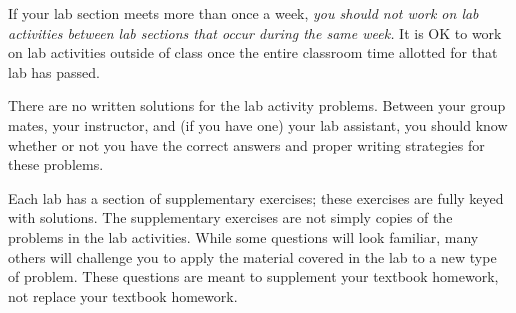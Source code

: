 \documentclass[12pt,]{book}
\theoremstyle{plain}
\theoremstyle{definition}
\numberwithin{equation}{section}
\begin{document}
\par
If your lab section meets more than once a week, \emph{you should not work on lab activities between lab sections that occur during the same week.} It is OK to work on lab activities outside of class once the entire classroom time allotted for that lab has passed.%
\par
There are no written solutions for the lab activity problems. Between your group mates, your instructor, and (if you have one) your lab assistant, you should know whether or not you have the correct answers and proper writing strategies for these problems.%
\par
Each lab has a section of supplementary exercises; these exercises are fully keyed with solutions. The supplementary exercises are not simply copies of the problems in the lab activities. While some questions will look familiar, many others will challenge you to apply the material covered in the lab to a new type of problem. These questions are meant to supplement your textbook homework, not replace your textbook homework.%
\end{document}
